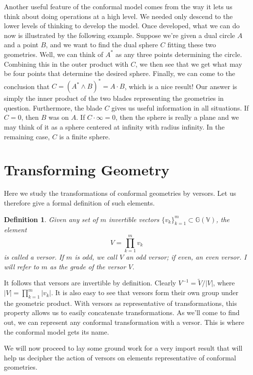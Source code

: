 \documentclass[12pt]{article}
\newcommand{\G}{\mathbb{G}}
\newcommand{\V}{\mathbb{V}}
\newcommand{\nvai}{\infty}
\newtheorem{definition}{Definition}[section]
\begin{document}
Another useful feature of the conformal model comes from the way it lets
us think about doing operations at a high level.  We needed only descend to
the lower levels of thinking to develop the model.  Once developed, what we can do now is illustrated
by the following example.  Suppose we're given a dual circle $A$ and
a point $B$, and we want to find the dual sphere $C$ fitting these two geometries.
Well, we can think of $A^*$ as any three points determining the circle.
Combining this in the outer product with $C$, we then see that we
get what may be four points that determine the desired sphere.
Finally, we can come to the conclusion that $C=(A^*\wedge B)^*=A\cdot B$,
which is a nice result!  Our answer is simply the inner product of the two blades
representing the geometries in question.  Furthermore, the blade $C$ gives
us useful information in all situations.  If $C=0$, then $B$ was on $A$.
If $C\cdot\nvai=0$, then the sphere is really a plane and we may
think of it as a sphere centered at infinity with radius infinity.  In the remaining case, $C$ is
a finite sphere.

\section{Transforming Geometry}

Here we study the transformations of conformal geometries
by versors.  Let us therefore give a formal definition of such
elements.
\begin{definition}
Given any set of $m$ invertible vectors $\{v_k\}_{k=1}^m\subset\G(\V)$,
the element
\begin{equation*}
V = \prod_{k=1}^m v_k
\end{equation*}
is called a versor.
If $m$ is odd, we call $V$ an odd versor; if even, an even versor.
I will refer to $m$ as the grade of the versor $V$.
\end{definition}
It follows that versors are invertible by definition.  Clearly $V^{-1}=\tilde{V}/|V|$,
where $|V|=\prod_{k=1}^m |v_k|$.  It is also easy to see that versors
form their own group under the geometric product.  With versors as representative
of transformations, this property allows us to easily concatenate transformations.
As we'll come to find out, we can represent any conformal transformation with
a versor.  This is where the conformal model gets its name.

We will now proceed to lay some ground work
for a very import result that will help us decipher the action of versors on elements
representative of conformal geometries.
\end{document}
